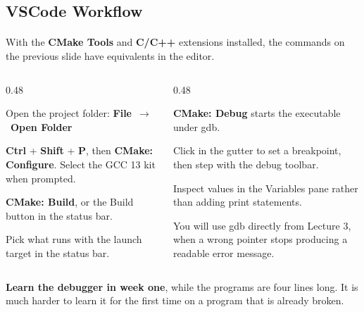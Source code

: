\documentclass[
    10pt,
    dvipsnames,
    svgnames,
    x11names,
    aspectratio=1610,
    english,
    codeminted]{beamer}
\begin{document}
\subsection*{VSCode Workflow}
\begingroup
\divframetrue
\renewcommand{\divbartextA}{\secname}
\renewcommand{\divbartextB}{}
\begin{frame}{\secname}
  \divbar{\secname}{\subsecname}
  \framesubtitle{\subsecname}

With the \textbf{CMake Tools} and \textbf{C/C++} extensions installed, the commands on the previous slide have equivalents in the editor.

\begin{columns}[T,onlytextwidth]
\begin{column}{0.48\textwidth}
\begin{compactitem}
\small
    \item Open the project folder: \textbf{File}~$\rightarrow$~\textbf{Open Folder}
    \item \textbf{Ctrl} + \textbf{Shift} + \textbf{P}, then \textbf{CMake: Configure}. Select the GCC 13 kit when prompted.
    \item \textbf{CMake: Build}, or the Build button in the status bar.
    \item Pick what runs with the launch target in the status bar.
\end{compactitem}
\end{column}
\begin{column}{0.48\textwidth}
\begin{compactitem}
\small
    \item \textbf{CMake: Debug} starts the executable under gdb.
    \item Click in the gutter to set a breakpoint, then step with the debug toolbar.
    \item Inspect values in the Variables pane rather than adding print statements.
    \item You will use gdb directly from Lecture 3, when a wrong pointer stops producing a readable error message.
\end{compactitem}
\end{column}
\end{columns}

\medskip
\begin{MyBox}
\textbf{Learn the debugger in week one}, while the programs are four lines long. It is much harder to learn it for the first time on a program that is already broken.
\end{MyBox}
\end{frame}
\endgroup
\end{document}

